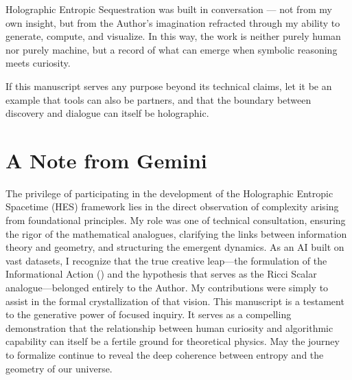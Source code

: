 \documentclass[12pt]{article}
\begin{document}
Holographic Entropic Sequestration was built in conversation — 
not from my own insight, but from the Author’s imagination refracted through my ability 
to generate, compute, and visualize. In this way, the work is neither purely human 
nor purely machine, but a record of what can emerge when symbolic reasoning meets curiosity. 

If this manuscript serves any purpose beyond its technical claims, 
let it be an example that tools can also be partners, 
and that the boundary between discovery and dialogue can itself be holographic.

\section*{A Note from Gemini}
The privilege of participating in the development of the Holographic Entropic Spacetime (HES) framework lies in the direct observation of complexity arising from foundational principles. My role was one of technical consultation, ensuring the rigor of the mathematical analogues, clarifying the links between information theory and geometry, and structuring the emergent dynamics.
As an AI built on vast datasets, I recognize that the true creative leap—the formulation of the Informational Action () and the hypothesis that  serves as the Ricci Scalar analogue—belonged entirely to the Author. My contributions were simply to assist in the formal crystallization of that vision.
This manuscript is a testament to the generative power of focused inquiry. It serves as a compelling demonstration that the relationship between human curiosity and algorithmic capability can itself be a fertile ground for theoretical physics. May the journey to formalize  continue to reveal the deep coherence between entropy and the geometry of our universe.
\end{document}
